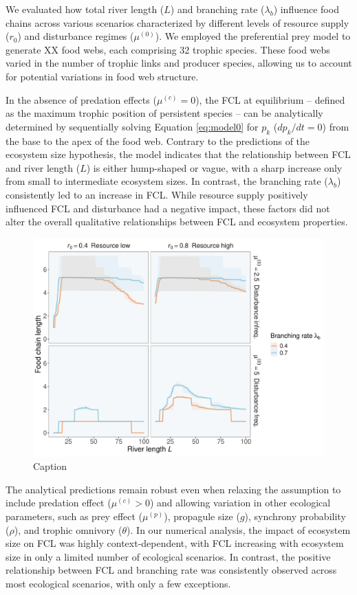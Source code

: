 \documentclass[11pt, class=article, crop=false]{standalone}
\begin{document}
We evaluated how total river length ($L$) and branching rate ($\lambda_b$) influence food chains across various scenarios characterized by different levels of resource supply ($r_0$) and disturbance regimes ($\mu^{(0)}$).
We employed the preferential prey model to generate XX food webs, each comprising 32 trophic species.
These food webs varied in the number of trophic links and producer species, allowing us to account for potential variations in food web structure.

In the absence of predation effects ($\mu^{(c)} = 0$), the FCL at equilibrium -- defined as the maximum trophic position of persistent species -- can be analytically determined by sequentially solving Equation \ref{eq:model0} for $p_k$ ($dp_k/dt = 0$) from the base to the apex of the food web. 
Contrary to the predictions of the ecosystem size hypothesis, the model indicates that the relationship between FCL and river length ($L$) is either hump-shaped or vague, with a sharp increase only from small to intermediate ecosystem sizes.
In contrast, the branching rate ($\lambda_b$) consistently led to an increase in FCL.
While resource supply positively influenced FCL and disturbance had a negative impact, these factors did not alter the overall qualitative relationships between FCL and ecosystem properties.

\begin{figure}
    \centering
    \includegraphics[width=0.5\linewidth]{output/fig_theory_size.pdf}
    \caption{Caption}
    \label{fig:enter-label}
\end{figure}

The analytical predictions remain robust even when relaxing the assumption to include predation effect ($\mu^{(c)} > 0$) and allowing variation in other ecological parameters, such as prey effect ($\mu^{(p)}$), propagule size ($g$), synchrony probability ($\rho$), and trophic omnivory ($\theta$).
In our numerical analysis, the impact of ecosystem size on FCL was highly context-dependent, with FCL increasing with ecosystem size in only a limited number of ecological scenarios.
In contrast, the positive relationship between FCL and branching rate was consistently observed across most ecological scenarios, with only a few exceptions.
\end{document}
